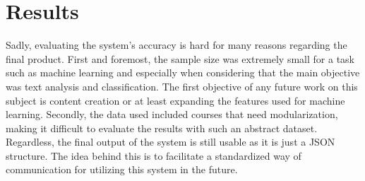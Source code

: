 \chapter{Results}
\label{ch:results}

Sadly, evaluating the system's accuracy is hard for many reasons regarding the final product. First and foremost, the sample size was extremely small for a task such as machine learning and especially when considering that the main objective was text analysis and classification. The first objective of any future work on this subject is content creation or at least expanding the features used for machine learning. Secondly, the data used included courses that need modularization, making it difficult to evaluate the results with such an abstract dataset. Regardless, the final output of the system is still usable as it is just a JSON structure. The idea behind this is to facilitate a standardized way of communication for utilizing this system in the future.